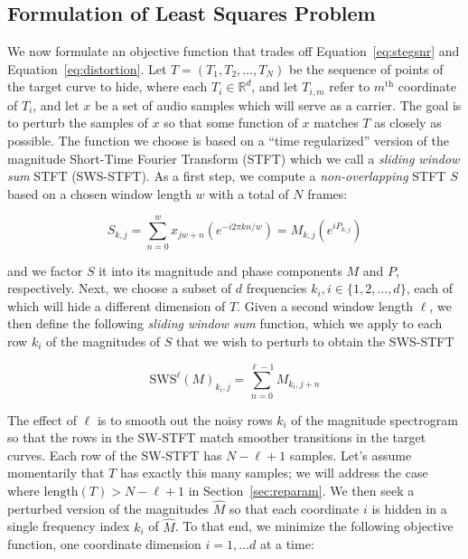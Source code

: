 \documentclass[runningheads]{llncs}
\begin{document}
\subsection{Formulation of Least Squares Problem}
\label{sec:formulation}

We now formulate an objective function that trades off Equation~\ref{eq:stegsnr} and Equation~\ref{eq:distortion}.  Let $T = (T_1, T_2, \hdots, T_N )$ be the sequence of points of the target curve to hide, where each $T_i \in \mathbb{R}^d$, and let $T_{i, m}$ refer to $m^{\text{th}}$ coordinate of $T_i$, and let $x$ be a set of audio samples which will serve as a carrier.  The goal is to perturb the samples of $x$ so that some function of $x$ matches $T$ as closely as possible.  The function we choose is based on a ``time regularized'' version of the magnitude Short-Time Fourier Transform (STFT) which we call a {\em sliding window sum} STFT (SWS-STFT).  As a first step, we compute a {\em non-overlapping} STFT $S$ based on a chosen window length $w$ with a total of $N$ frames:

\begin{equation}
  S_{k, j} = \sum_{n = 0}^w x_{jw + n} \left(e^{-i 2 \pi k n / w} \right) = M_{k, j} \left( e^{i P_{k, j}} \right)
\end{equation}

and we factor $S$ it into its magnitude and phase components $M$ and $P$, respectively.  Next, we choose a subset of $d$ frequencies $k_i, i \in \{1, 2, \hdots, d\}$, each of which will hide a different dimension of $T$.  Given a second window length $\ell$, we then define the following {\em sliding window sum} function, which we apply to each row $k_i$ of the magnitudes of $S$ that we wish to perturb to obtain the SWS-STFT

\begin{equation}
  \text{SWS}^{\ell}(M)_{k_i, j} = \sum_{n = 0}^{\ell-1} M_{k_i, j+n}
\end{equation}

The effect of $\ell$ is to smooth out the noisy rows $k_i$ of the magnitude spectrogram so that the rows in the SW-STFT match smoother transitions in the target curves.  Each row of the SW-STFT has $N-\ell+1$ samples.  Let's assume momentarily that $T$ has exactly this many samples; we will address the case where $\text{length}(T) > N-\ell+1$ in Section~\ref{sec:reparam}.  We then seek a perturbed version of the magnitudes $\hat{M}$ so that each coordinate $i$ is hidden in a single frequency index $k_i$ of $\hat{M}$.  To that end, we minimize the following objective function, one coordinate dimension $i = 1, ... d$ at a time:
\end{document}

